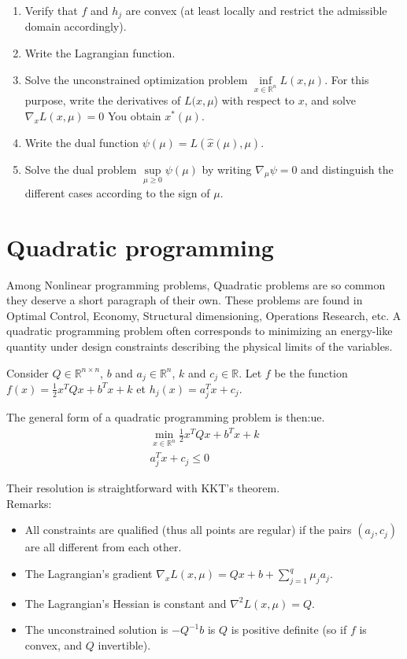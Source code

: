 \documentclass{article}
\begin{document}
\begin{enumerate}
\item Verify that $f$ and $h_j$ are convex (at least locally and restrict the admissible domain accordingly).
\item Write the Lagrangian function.
\item Solve the unconstrained optimization problem $\inf\limits_{x\in
\mathbb{R}^n} L(x,\mu)$. For this purpose, write the derivatives of $L(x,\mu$) with respect to $x$, and solve $\nabla_x L(x,\mu)=0$ You obtain $x^*(\mu)$.
\item Write the dual function $\psi(\mu) = L(\hat{x}(\mu),\mu)$.
\item Solve the dual problem $\sup\limits_{\mu \geq 0} \psi(\mu)$ by writing $\nabla_\mu \psi = 0$  and distinguish the different cases according to the sign of $\mu$.
\end{enumerate}

\section{Quadratic programming}

Among Nonlinear programming problems, Quadratic problems are so common they deserve a short paragraph of their own. These problems are found in Optimal Control, Economy, Structural dimensioning,  Operations Research, etc. A quadratic programming problem often corresponds to minimizing an energy-like quantity under design constraints describing the physical limits of the variables.

\noindent Consider $Q\in\mathbb{R}^{n\times n}$, $b$ and $a_j\in\mathbb{R}^n$, $k$ and $c_j\in \mathbb{R}$. Let $f$ be the function $f(x) = \frac{1}{2}x^T Q x + b^Tx +k$ et $h_j(x) = a_j^Tx +c_j$.

\noindent The general form of a quadratic programming problem is then:ue.
\begin{gather*}
\min\limits_{x\in\mathbb{R}^n} \frac{1}{2}x^T Q x + b^Tx +k\\
a_j^Tx +c_j \leq 0
\end{gather*}

\noindent Their resolution is straightforward with KKT's theorem.\\

\noindent Remarks:
\begin{itemize}
\item All constraints are qualified (thus all points are regular) if the pairs $(a_j, c_j)$ are all different from each other.
\item The Lagrangian's gradient $\nabla_x L(x,\mu) = Qx+b+\sum\limits_{j=1}^q \mu_j a_j$.
\item The Lagrangian's Hessian is constant and $\nabla^2 L(x,\mu) = Q$.
\item The unconstrained solution is $-Q^{-1}b$ is $Q$ is positive definite (so if $f$ is convex, and $Q$ invertible).
\end{itemize}
\end{document}
